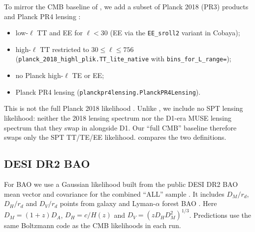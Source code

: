 To mirror the CMB baseline of \cite{arxiv2601_16277}, we add a subset of Planck 2018 (PR3) products and Planck PR4 lensing \cite{planck2018_likelihood,planck_pr4_lensing,planck_pr4_lensing_maps}:
\begin{itemize}[leftmargin=*, itemsep=2pt]
  \item low-$\ell$ TT and EE for $\ell<30$ (EE via the \texttt{EE\_sroll2} variant in Cobaya);
  \item high-$\ell$ TT restricted to $30\le\ell\le756$ (\texttt{planck\_2018\_highl\_plik.\allowbreak TT\_lite\_native} with \texttt{bins\_for\_L\_range=\allowbreak[30,756]});
  \item no Planck high-$\ell$ TE or EE;
  \item Planck PR4 lensing (\texttt{planckpr4lensing.PlanckPR4Lensing}).
\end{itemize}
This is not the full Planck 2018 likelihood \cite{planck2018_cosmoparams}. Unlike \cite{arxiv2601_16277}, we include no SPT lensing likelihood: neither the 2018 lensing spectrum nor the D1-era MUSE lensing spectrum that they swap in alongside D1. Our ``full CMB'' baseline therefore swaps only the SPT TT/TE/EE likelihood.  compares the two definitions.

\begin{table}[t]
  \centering
  \caption{CMB baselines as defined in \cite{arxiv2601_16277}. Our ``full CMB'' baseline uses the same SPT primary multipole ranges and Planck subset, keeps Planck PR4 lensing, and omits both SPT lensing likelihoods, so that only the SPT TT/TE/EE lens changes.}
  \label{tab:baseline-defs}
  \small
  
\end{table}

\subsection{DESI DR2 BAO}
\label{sec:desi-bao}

For BAO we use a Gaussian likelihood built from the public DESI DR2 BAO mean vector and covariance for the combined ``ALL'' sample \cite{desi_dr2_bao_docs,bao_data_v26,desi_dr2_results_ii_bao,desi_dr2_results_i_lya}. It includes $D_M/r_d$, $D_H/r_d$ and $D_V/r_d$ points from galaxy and Lyman-$\alpha$ forest BAO \cite{eisenstein2005_baopeak}. Here $D_M=(1+z)D_A$, $D_H=c/H(z)$ and $D_V=(zD_HD_M^2)^{1/3}$. Predictions use the same Boltzmann code as the CMB likelihoods in each run.

